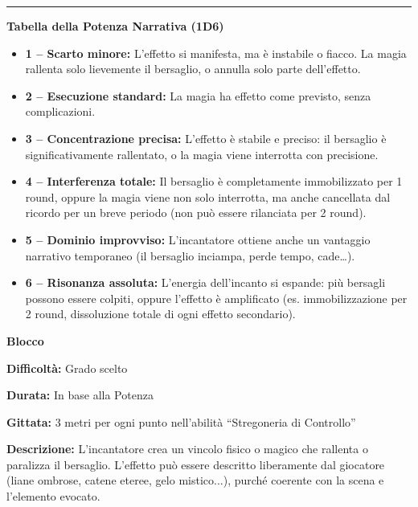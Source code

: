 \documentclass[./magie.tex]{subfiles}
\begin{document}
\vspace{0.2cm}
\noindent
\begin{center}
\rule{\textwidth}{0.4pt} 
\end{center}
\vspace{0.2cm}
{\zarafirtitlefont\Large\bfseries\noindent Tabella della Potenza Narrativa (1D6)}
\begin{itemize}
\item \textbf{1 – Scarto minore:} L’effetto si manifesta, ma è instabile o fiacco. La magia rallenta solo lievemente il bersaglio, o annulla solo parte dell’effetto.
\item \textbf{2 – Esecuzione standard:} La magia ha effetto come previsto, senza complicazioni.
\item \textbf{3 – Concentrazione precisa:} L’effetto è stabile e preciso: il bersaglio è significativamente rallentato, o la magia viene interrotta con precisione.
\item \textbf{4 – Interferenza totale:} Il bersaglio è completamente immobilizzato per 1 round, oppure la magia viene non solo interrotta, ma anche cancellata dal ricordo per un breve periodo (non può essere rilanciata per 2 round).
\item \textbf{5 – Dominio improvviso:} L’incantatore ottiene anche un vantaggio narrativo temporaneo (il bersaglio inciampa, perde tempo, cade…).
\item \textbf{6 – Risonanza assoluta:} L’energia dell’incanto si espande: più bersagli possono essere colpiti, oppure l’effetto è amplificato (es. immobilizzazione per 2 round, dissoluzione totale di ogni effetto secondario).
\end{itemize}

{\zarafirtitlefont\Large\bfseries\noindent Blocco}\\
\begin{description}
\item \textbf{Difficoltà:} Grado scelto
\item \textbf{Durata:} In base alla Potenza
\item \textbf{Gittata:} 3 metri per ogni punto nell’abilità “Stregoneria di Controllo”
\item \textbf{Descrizione:} L’incantatore crea un vincolo fisico o magico che rallenta o paralizza il bersaglio. L’effetto può essere descritto liberamente dal giocatore (liane ombrose, catene eteree, gelo mistico...), purché coerente con la scena e l’elemento evocato.
\end{description}
\end{document}
